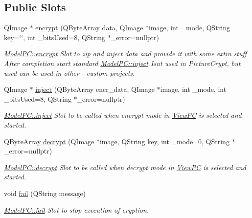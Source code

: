 \subsection*{Public Slots}
\begin{DoxyCompactItemize}
\item 
Q\+Image $\ast$ \hyperlink{class_model_p_c_a6f191f62d4635d0d3555fcc0be298794}{encrypt} (Q\+Byte\+Array data, Q\+Image $\ast$image, int \+\_\+mode, Q\+String key=\char`\"{}\char`\"{}, int \+\_\+bits\+Used=8, Q\+String $\ast$\+\_\+error=nullptr)
\begin{DoxyCompactList}\small\item\em \hyperlink{class_model_p_c_a6f191f62d4635d0d3555fcc0be298794}{Model\+P\+C\+::encrypt} Slot to zip and inject data and provide it with some extra stuff After completion start standard \hyperlink{class_model_p_c_aada6a04d81ada8f2b4ba18108c8d6f10}{Model\+P\+C\+::inject} Isn\textquotesingle{}t used in Picture\+Crypt, but used can be used in other -\/ custom projects. \end{DoxyCompactList}\item 
Q\+Image $\ast$ \hyperlink{class_model_p_c_aada6a04d81ada8f2b4ba18108c8d6f10}{inject} (Q\+Byte\+Array encr\+\_\+data, Q\+Image $\ast$image, int \+\_\+mode, int \+\_\+bits\+Used=8, Q\+String $\ast$\+\_\+error=nullptr)
\begin{DoxyCompactList}\small\item\em \hyperlink{class_model_p_c_aada6a04d81ada8f2b4ba18108c8d6f10}{Model\+P\+C\+::inject} Slot to be called when encrypt mode in \hyperlink{class_view_p_c}{View\+PC} is selected and started. \end{DoxyCompactList}\item 
Q\+Byte\+Array \hyperlink{class_model_p_c_a5995215a34a1e1f504035715a8013809}{decrypt} (Q\+Image $\ast$image, Q\+String key, int \+\_\+mode=0, Q\+String $\ast$\+\_\+error=nullptr)
\begin{DoxyCompactList}\small\item\em \hyperlink{class_model_p_c_a5995215a34a1e1f504035715a8013809}{Model\+P\+C\+::decrypt} Slot to be called when decrypt mode in \hyperlink{class_view_p_c}{View\+PC} is selected and started. \end{DoxyCompactList}\item 
void \hyperlink{class_model_p_c_a47464b59b7e37fcee25e55475708aabd}{fail} (Q\+String message)
\begin{DoxyCompactList}\small\item\em \hyperlink{class_model_p_c_a47464b59b7e37fcee25e55475708aabd}{Model\+P\+C\+::fail} Slot to stop execution of cryption. \end{DoxyCompactList}\item 

\end{DoxyCompactItemize}
